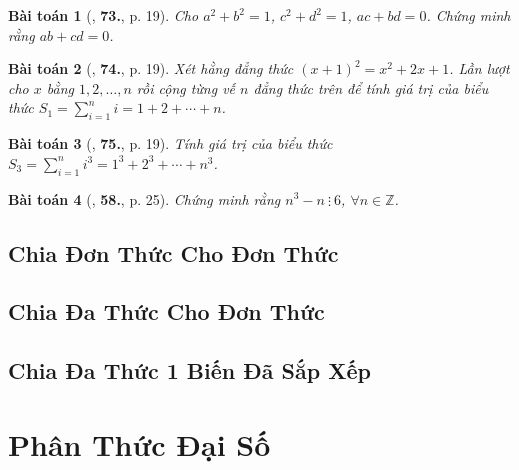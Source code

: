 \documentclass{article}
\numberwithin{equation}{section}
\newtheorem{baitoan}{Bài toán}[section]
\begin{document}
\begin{baitoan}[\cite{Binh_Toan_8_tap_1}, \textbf{73.}, p. 19]
	Cho $a^2 + b^2 = 1$, $c^2 + d^2 = 1$, $ac + bd = 0$. Chứng minh rằng $ab + cd = 0$.
\end{baitoan}

\begin{baitoan}[\cite{Binh_Toan_8_tap_1}, \textbf{74.}, p. 19]
	Xét hằng đẳng thức $(x + 1)^2 = x^2 + 2x + 1$. Lần lượt cho $x$ bằng $1,2,\ldots,n$ rồi cộng từng vế $n$ đẳng thức trên để tính giá trị của biểu thức $S_1 = \sum_{i=1}^n i = 1 + 2 + \cdots + n$.
\end{baitoan}

\begin{baitoan}[\cite{Binh_Toan_8_tap_1}, \textbf{75.}, p. 19]
	Tính giá trị của biểu thức $S_3 = \sum_{i=1}^n i^3 = 1^3 + 2^3 + \cdots + n^3$.
\end{baitoan}

\begin{baitoan}[\cite{SGK_Toan_8_tap_1}, \textbf{58.}, p. 25]
	Chứng minh rằng $n^3 - n\ \vdots\ 6$, $\forall n\in\mathbb{Z}$.
\end{baitoan}


\subsection{Chia Đơn Thức Cho Đơn Thức}


\subsection{Chia Đa Thức Cho Đơn Thức}


\subsection{Chia Đa Thức 1 Biến Đã Sắp Xếp}


\section{Phân Thức Đại Số}
\end{document}
